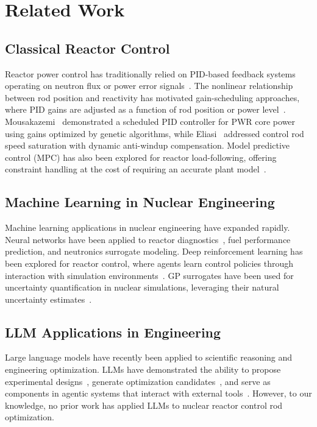 \documentclass[11pt,twocolumn]{article}
\begin{document}
\section{Related Work}
\label{sec:related}

\subsection{Classical Reactor Control}

Reactor power control has traditionally relied on PID-based feedback systems operating on neutron flux or power error signals~\cite{duderstadt1976nuclear}.
The nonlinear relationship between rod position and reactivity has motivated gain-scheduling approaches, where PID gains are adjusted as a function of rod position or power level~\cite{cho2012nuclear}.
Mousakazemi~\cite{mousakazemi2019scheduled} demonstrated a scheduled PID controller for PWR core power using gains optimized by genetic algorithms, while Eliasi~\cite{eliasi2019antiwindup} addressed control rod speed saturation with dynamic anti-windup compensation.
Model predictive control (MPC) has also been explored for reactor load-following, offering constraint handling at the cost of requiring an accurate plant model~\cite{eliasi2011robust}.

\subsection{Machine Learning in Nuclear Engineering}

Machine learning applications in nuclear engineering have expanded rapidly.
Neural networks have been applied to reactor diagnostics~\cite{uhrig1999nuclear}, fuel performance prediction, and neutronics surrogate modeling.
Deep reinforcement learning has been explored for reactor control, where agents learn control policies through interaction with simulation environments~\cite{radaideh2021physics}.
GP surrogates have been used for uncertainty quantification in nuclear simulations, leveraging their natural uncertainty estimates~\cite{wu2018kriging}.

\subsection{LLM Applications in Engineering}

Large language models have recently been applied to scientific reasoning and engineering optimization.
LLMs have demonstrated the ability to propose experimental designs~\cite{boiko2023autonomous}, generate optimization candidates~\cite{yang2024large}, and serve as components in agentic systems that interact with external tools~\cite{schick2023toolformer}.
However, to our knowledge, no prior work has applied LLMs to nuclear reactor control rod optimization.
\end{document}
